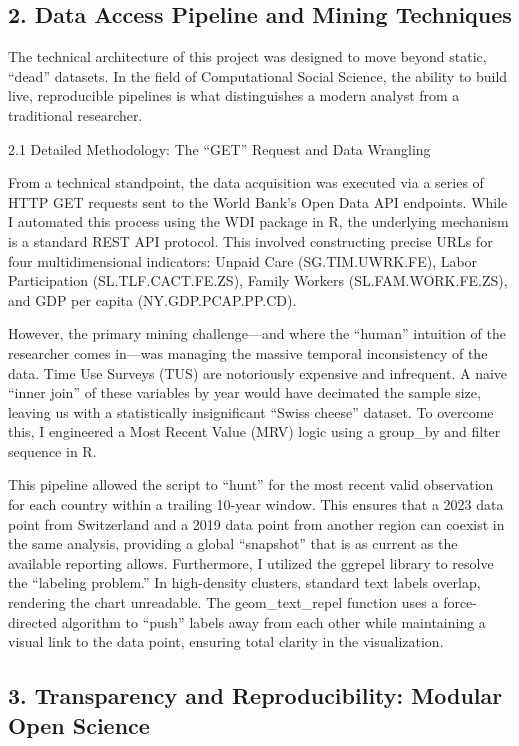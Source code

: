 \documentclass[
  letterpaper,
  DIV=11,
  numbers=noendperiod]{scrartcl}
\begin{document}
\subsection{2. Data Access Pipeline and Mining
Techniques}\label{data-access-pipeline-and-mining-techniques}

The technical architecture of this project was designed to move beyond
static, ``dead'' datasets. In the field of Computational Social Science,
the ability to build live, reproducible pipelines is what distinguishes
a modern analyst from a traditional researcher.

2.1 Detailed Methodology: The ``GET'' Request and Data Wrangling

From a technical standpoint, the data acquisition was executed via a
series of HTTP GET requests sent to the World Bank's Open Data API
endpoints. While I automated this process using the WDI package in R,
the underlying mechanism is a standard REST API protocol. This involved
constructing precise URLs for four multidimensional indicators: Unpaid
Care (SG.TIM.UWRK.FE), Labor Participation (SL.TLF.CACT.FE.ZS), Family
Workers (SL.FAM.WORK.FE.ZS), and GDP per capita (NY.GDP.PCAP.PP.CD).

However, the primary mining challenge---and where the ``human''
intuition of the researcher comes in---was managing the massive temporal
inconsistency of the data. Time Use Surveys (TUS) are notoriously
expensive and infrequent. A naive ``inner join'' of these variables by
year would have decimated the sample size, leaving us with a
statistically insignificant ``Swiss cheese'' dataset. To overcome this,
I engineered a Most Recent Value (MRV) logic using a group\_by and
filter sequence in R.

This pipeline allowed the script to ``hunt'' for the most recent valid
observation for each country within a trailing 10-year window. This
ensures that a 2023 data point from Switzerland and a 2019 data point
from another region can coexist in the same analysis, providing a global
``snapshot'' that is as current as the available reporting allows.
Furthermore, I utilized the ggrepel library to resolve the ``labeling
problem.'' In high-density clusters, standard text labels overlap,
rendering the chart unreadable. The geom\_text\_repel function uses a
force-directed algorithm to ``push'' labels away from each other while
maintaining a visual link to the data point, ensuring total clarity in
the visualization.

\subsection{3. Transparency and Reproducibility: Modular Open
Science}\label{transparency-and-reproducibility-modular-open-science}
\end{document}
